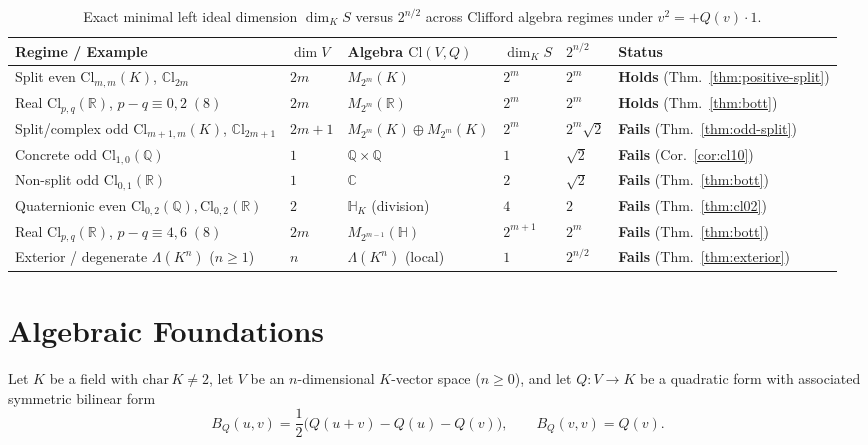 \documentclass[11pt,a4paper]{article}
\theoremstyle{plain}
\theoremstyle{definition}
\theoremstyle{remark}
\newcommand{\Cl}{\mathrm{Cl}}
\newcommand{\CCl}{\mathbb{C}\mathrm{l}}
\begin{document}
\begin{table}[ht]
\centering
\footnotesize
\setlength{\tabcolsep}{4.5pt}
\renewcommand{\arraystretch}{1.22}
\begin{tabular}{@{}llllll@{}}
\hline
\textbf{Regime / Example} & $\dim V$ & \textbf{Algebra $\Cl(V,Q)$} & $\dim_K S$ & $2^{n/2}$ & \textbf{Status} \\
\hline
Split even $\Cl_{m,m}(K)$, $\CCl_{2m}$ & $2m$ & $M_{2^m}(K)$ & $2^m$ & $2^m$ & \textbf{Holds} (Thm.~\ref{thm:positive-split}) \\
Real $\Cl_{p,q}(\mathbb{R})$, $p{-}q \equiv 0,2\;(8)$ & $2m$ & $M_{2^m}(\mathbb{R})$ & $2^m$ & $2^m$ & \textbf{Holds} (Thm.~\ref{thm:bott}) \\
\hline
Split/complex odd $\Cl_{m+1,m}(K)$, $\CCl_{2m+1}$ & $2m{+}1$ & $M_{2^m}(K) \oplus M_{2^m}(K)$ & $2^m$ & $2^m\sqrt{2}$ & \textbf{Fails} (Thm.~\ref{thm:odd-split}) \\
Concrete odd $\Cl_{1,0}(\mathbb{Q})$ & $1$ & $\mathbb{Q} \times \mathbb{Q}$ & $1$ & $\sqrt{2}$ & \textbf{Fails} (Cor.~\ref{cor:cl10}) \\
Non-split odd $\Cl_{0,1}(\mathbb{R})$ & $1$ & $\mathbb{C}$ & $2$ & $\sqrt{2}$ & \textbf{Fails} (Thm.~\ref{thm:bott}) \\
Quaternionic even $\Cl_{0,2}(\mathbb{Q}), \Cl_{0,2}(\mathbb{R})$ & $2$ & $\mathbb{H}_K$ (division) & $4$ & $2$ & \textbf{Fails} (Thm.~\ref{thm:cl02}) \\
Real $\Cl_{p,q}(\mathbb{R})$, $p{-}q \equiv 4,6\;(8)$ & $2m$ & $M_{2^{m-1}}(\mathbb{H})$ & $2^{m+1}$ & $2^m$ & \textbf{Fails} (Thm.~\ref{thm:bott}) \\
Exterior / degenerate $\Lambda(K^n)$ ($n \ge 1$) & $n$ & $\Lambda(K^n)$ (local) & $1$ & $2^{n/2}$ & \textbf{Fails} (Thm.~\ref{thm:exterior}) \\
\hline
\end{tabular}
\caption{Exact minimal left ideal dimension $\dim_K S$ versus $2^{n/2}$ across Clifford algebra regimes under $v^2 = +Q(v)\cdot 1$.}
\label{tab:overview}
\end{table}

\section{Algebraic Foundations}

Let $K$ be a field with $\mathrm{char}\,K \neq 2$, let $V$ be an $n$-dimensional $K$-vector space ($n \ge 0$), and let $Q : V \to K$ be a quadratic form with associated symmetric bilinear form
\[
  B_Q(u, v) = \frac{1}{2}\bigl(Q(u + v) - Q(u) - Q(v)\bigr), \qquad B_Q(v, v) = Q(v).
\]
\end{document}
